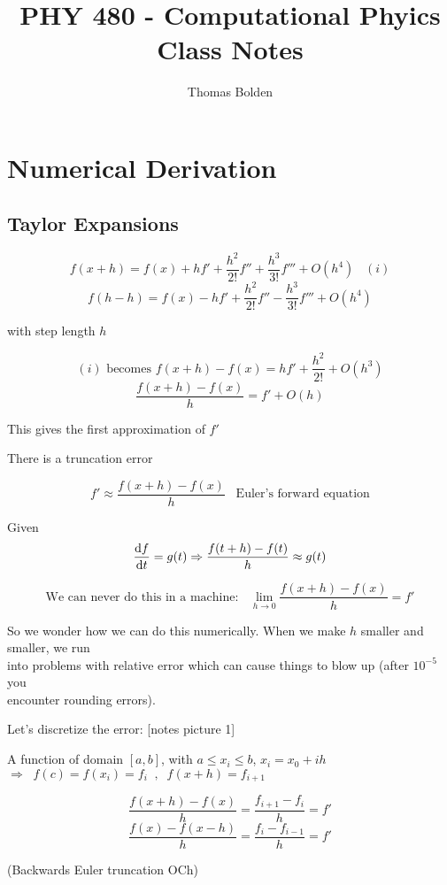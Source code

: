 \documentclass[10pt]{article} %
\title{PHY 480 - Computational Phyics Class Notes}
\author{Thomas Bolden}
\date{}
\begin{document}
\tableofcontents

\maketitle

\section{Numerical Derivation} %


\subsection{Taylor Expansions}

    \[ f(x+h) = f(x) + hf'+\frac{h^2}{2!}f'' + \frac{h^3}{3!}f''' + O(h^4) \;\;\; (i) \]
    \[ f(h-h) = f(x) - hf'+\frac{h^2}{2!} f'' - \frac{h^3}{3!} f''' +O(h^4) \]

    with step length $h$

\[ (i) \text{ becomes } f(x+h)-f(x) = hf'+\frac{h^2}{2!}+O(h^3) \]
\[ \frac{f(x+h)-f(x)}{h} = f'+O(h) \]

This gives the first approximation of $f'$

There is a truncation error

\[ f' \approx \dfrac{f(x+h)-f(x)}{h} \;\;\; \text{Euler's forward equation} \]

Given
\[ \frac{\dif{f}}{\dif{t}} = g(t) \Rightarrow \dfrac{f(t+h)-f(t)}{h} \approx g(t) \]

\[ \text{We can never do this in a machine: } \;\; \lim_{h\to 0} \dfrac{f(x+h)-f(x)}{h} = f' \]

So we wonder how we can do this numerically. When we make $h$ smaller and smaller, we run \\ into problems with relative error which can cause things to blow up (after $10^{-5}$ you \\ encounter rounding errors).

Let's discretize the error: [notes picture 1]

A function of domain $[a,b]$, with $a \leq x_i \leq b$, $x_i = x_0 + ih $ \\ $ \Rightarrow \;\; f(c) = f(x_i) = f_i \;\; , \;\; f(x+h) = f_{i+1} $

\[ \dfrac{f(x+h)-f(x)}{h} = \dfrac{f_{i+1}-f_i}{h} = f' \]
\[ \dfrac{f(x)-f(x-h)}{h} = \dfrac{f_i-f_{i-1}}{h} = f' \]

(Backwards Euler truncation OCh) 
\end{document}
